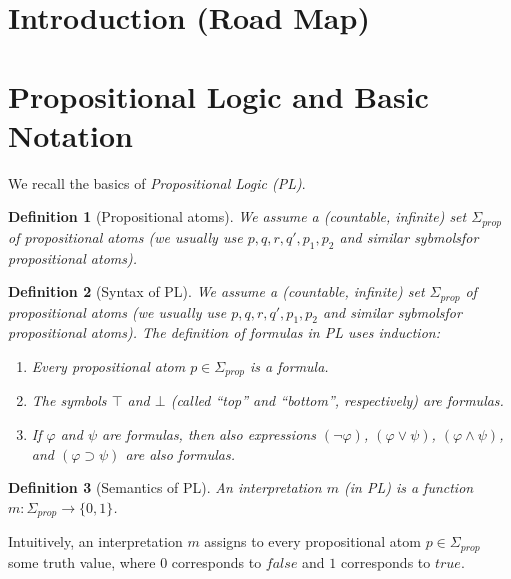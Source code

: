 \documentclass[12pt]{extarticle}
\newtheorem{definition}{Definition}
\begin{document}



\tableofcontents

\section{Introduction (Road Map)}


\cleardoublepage

\section{Propositional Logic and Basic Notation}

\newcommand{\allprops}{\Sigma_{prop}}

We recall the basics of \emph{Propositional Logic (PL)}.



\begin{definition}[Propositional atoms]
  We assume a (countable, infinite) set $\allprops$  of
  \emph{propositional atoms} (we usually use $p,q,r,q',p_1,p_2$ and
  similar sybmolsfor propositional atoms).
\end{definition}

\begin{definition}[Syntax of PL]
  We assume a (countable, infinite) set $\allprops$  of
  \emph{propositional atoms} (we usually use $p,q,r,q',p_1,p_2$ and
  similar sybmolsfor propositional atoms).  The definition of \emph{formulas} in PL  uses induction:
  \begin{enumerate}
  \item Every propositional atom $p\in \allprops$ is a formula.
  \item The symbols $\top$ and $\bot$ (called ``top'' and ``bottom'', respectively) are formulas.
   \item If $\varphi$ and $\psi$ are formulas, then also expressions $(\neg \varphi)$, $(\varphi\lor \psi)$, $(\varphi\land \psi)$, and $(\varphi\supset\psi)$ are also formulas.
  \end{enumerate}
\end{definition}



\begin{definition}[Semantics of PL]
  An \emph{interpretation} $m$ (in PL) is a function
  $m:\allprops \rightarrow \{0,1\}$.
\end{definition}
Intuitively, an interpretation $m$ assigns to every propositional atom
$p\in \allprops$ some truth value, where $0$ corresponds to $\mathit{false}$ and $1$ corresponds to $\mathit{true}$.
\end{document}
